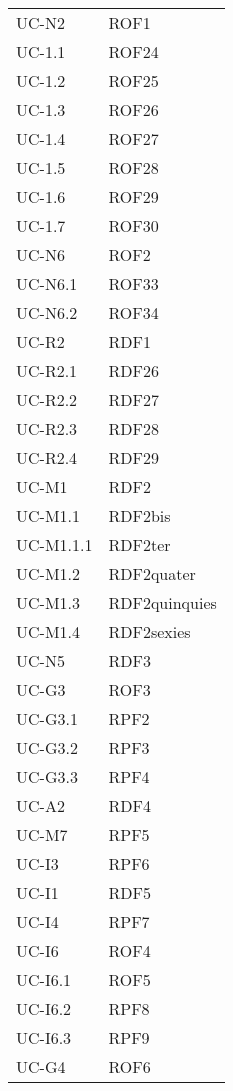 \begin{longtable}{| p{5cm} | p{5cm} |}
		UC-N2& ROF1  \\
		\rowcolor{LightGray}
		UC-1.1 & ROF24 \\
		UC-1.2 & ROF25 \\
		\rowcolor{LightGray}
		UC-1.3 & ROF26 \\
		UC-1.4 & ROF27 \\
		\rowcolor{LightGray}
		UC-1.5 & ROF28 \\
		UC-1.6 & ROF29 \\
		\rowcolor{LightGray}
		UC-1.7 & ROF30 \\		
		UC-N6 & ROF2 \\
		\rowcolor{LightGray}
		UC-N6.1 & ROF33 \\
		UC-N6.2 & ROF34 \\
		\rowcolor{LightGray}
		UC-R2 & RDF1 \\
		UC-R2.1 & RDF26 \\
		\rowcolor{LightGray}
		UC-R2.2 & RDF27 \\
		UC-R2.3 & RDF28 \\
		\rowcolor{LightGray}
		UC-R2.4 & RDF29 \\
		UC-M1 & RDF2 \\
		\rowcolor{LightGray}
		UC-M1.1 & RDF2bis\\
		UC-M1.1.1 & RDF2ter\\
		UC-M1.2 & RDF2quater\\
		UC-M1.3 & RDF2quinquies\\
		UC-M1.4 & RDF2sexies\\
		\rowcolor{LightGray}
		UC-N5 & RDF3 \\
		UC-G3 & ROF3 \\
		\rowcolor{LightGray}
		UC-G3.1 & RPF2 \\
		\rowcolor{LightGray}
		UC-G3.2 & RPF3 \\
		UC-G3.3 & RPF4 \\
		\rowcolor{LightGray}
		UC-A2 & RDF4 \\
		UC-M7 & RPF5 \\
		\rowcolor{LightGray}
		UC-I3 & RPF6 \\
		UC-I1 & RDF5 \\
		\rowcolor{LightGray}
		UC-I4 & RPF7 \\
		UC-I6 & ROF4 \\
		\rowcolor{LightGray}
		UC-I6.1 & ROF5 \\
		UC-I6.2 & RPF8 \\
		\rowcolor{LightGray}
		UC-I6.3 & RPF9 \\
		UC-G4 & ROF6 \\

\end{longtable}
